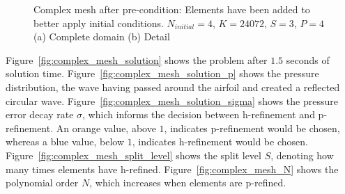\begin{figure}[H]
    \centering
    \hfill
    \caption{Complex mesh after pre-condition: Elements have been added to better apply initial
        conditions. \(N_{initial} = 4\), \(K = 24072\), \(S = 3\), \(P = 4\) (a) Complete domain (b)
        Detail}\label{fig:complex_mesh_pre_condition}
\end{figure}

Figure~\ref{fig:complex_mesh_solution} shows the problem after \(1.5\) seconds of solution time.
Figure~\ref{fig:complex_mesh_solution_p} shows the pressure distribution, the wave having passed
around the airfoil and created a reflected circular wave.
Figure~\ref{fig:complex_mesh_solution_sigma} shows the pressure error decay rate \(\sigma \), which
informs the decision between h-refinement and p-refinement. An orange value, above \(1\), indicates
p-refinement would be chosen, whereas a blue value, below \(1\), indicates h-refinement would be
chosen. Figure~\ref{fig:complex_mesh_split_level} shows the split level \(S\), denoting how many
times elements have h-refined. Figure~\ref{fig:complex_mesh_N} shows the polynomial order \(N\),
which increases when elements are p-refined.

